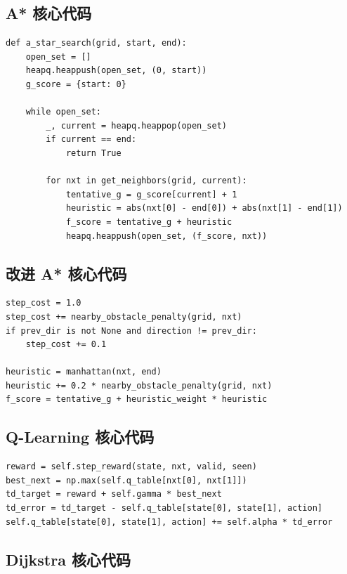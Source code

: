 \documentclass[12pt,a4paper,fontset=none]{ctexart}
\begin{document}
\subsection{A* 核心代码}

\begin{lstlisting}[caption={A* 的节点扩展逻辑}]
def a_star_search(grid, start, end):
    open_set = []
    heapq.heappush(open_set, (0, start))
    g_score = {start: 0}

    while open_set:
        _, current = heapq.heappop(open_set)
        if current == end:
            return True

        for nxt in get_neighbors(grid, current):
            tentative_g = g_score[current] + 1
            heuristic = abs(nxt[0] - end[0]) + abs(nxt[1] - end[1])
            f_score = tentative_g + heuristic
            heapq.heappush(open_set, (f_score, nxt))
\end{lstlisting}

\subsection{改进 A* 核心代码}

\begin{lstlisting}[caption={改进 A* 的附加代价}]
step_cost = 1.0
step_cost += nearby_obstacle_penalty(grid, nxt)
if prev_dir is not None and direction != prev_dir:
    step_cost += 0.1

heuristic = manhattan(nxt, end)
heuristic += 0.2 * nearby_obstacle_penalty(grid, nxt)
f_score = tentative_g + heuristic_weight * heuristic
\end{lstlisting}

\subsection{Q-Learning 核心代码}

\begin{lstlisting}[caption={Q-Learning 的价值更新}]
reward = self.step_reward(state, nxt, valid, seen)
best_next = np.max(self.q_table[nxt[0], nxt[1]])
td_target = reward + self.gamma * best_next
td_error = td_target - self.q_table[state[0], state[1], action]
self.q_table[state[0], state[1], action] += self.alpha * td_error
\end{lstlisting}

\subsection{Dijkstra 核心代码}
\end{document}
